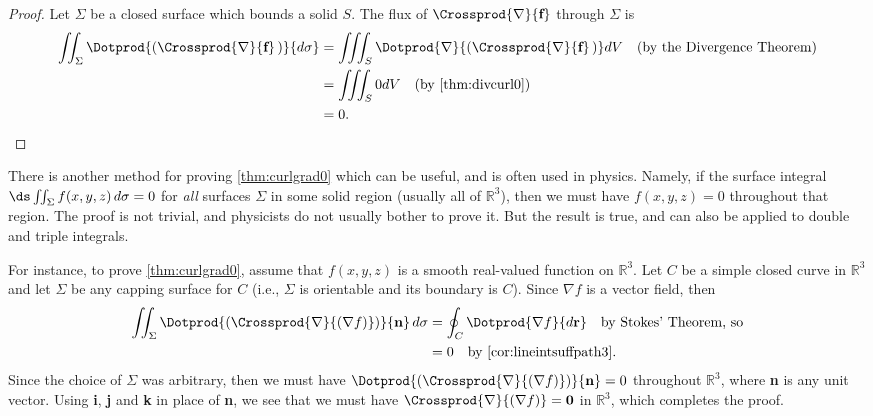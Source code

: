 \begin{proof}
 Let $\Sigma$ be a closed surface which bounds a solid $S$. The flux of $\Crossprod{\nabla}{\textbf{f}}$ through $\Sigma$ is
 \begin{align*}
  \iint_{\Sigma} \Dotprod{(\Crossprod{\nabla}{\textbf{f}}\,)}{d\sigma} &=
   \iiint_{S} \Dotprod{\nabla}{(\Crossprod{\nabla}{\textbf{f}}\,)} dV\quad\text{(by the Divergence Theorem)}\\
   &= \iiint_{S} 0 dV \quad\text{(by \autoref{thm:divcurl0})}\\
   &= 0 .\qedhere
 \end{align*}
\end{proof}

There is another method for proving \autoref{thm:curlgrad0} which can be useful, and is often used in physics. Namely, if the surface integral $\ds\iint_{\Sigma} f(x,y,z)\,d\sigma = 0$ for \emph{all} surfaces $\Sigma$ in some solid region (usually all of $\mathbb{R}^{3}$), then we must have $f(x,y,z) = 0$ throughout that region. The proof is not trivial, and physicists do not usually bother to prove it. But the result is true, and can also be applied to double and triple integrals.

For instance, to prove \autoref{thm:curlgrad0}, assume that $f(x,y,z)$ is a smooth real-valued function on $\mathbb{R}^{3}$. Let $C$ be a simple closed curve in $\mathbb{R}^{3}$ and let $\Sigma$ be any capping surface for $C$ (i.e., $\Sigma$ is orientable and its boundary is $C$). Since $\nabla f$ is a vector field, then
\begin{align*}
 \iint_{\Sigma} \Dotprod{\left( \Crossprod{\nabla}{(\nabla f)} \right) }{\textbf{n}}\,d\sigma &=
  \oint_{C}\Dotprod{\nabla f}{d\textbf{r}} \quad\text{by Stokes' Theorem, so}\\
 &= 0 \quad\text{by \autoref{cor:lineintsuffpath3}.}
\end{align*}
Since the choice of $\Sigma$ was arbitrary, then we must have $\Dotprod{(\Crossprod{\nabla}{(\nabla f)})}{\textbf{n}} = 0$ throughout $\mathbb{R}^{3}$, where \textbf{n} is any unit vector. Using \textbf{i}, \textbf{j} and \textbf{k} in place of \textbf{n}, we see that we must have $\Crossprod{\nabla}{(\nabla f)} = \textbf{0}$ in $\mathbb{R}^{3}$, which completes the proof.

